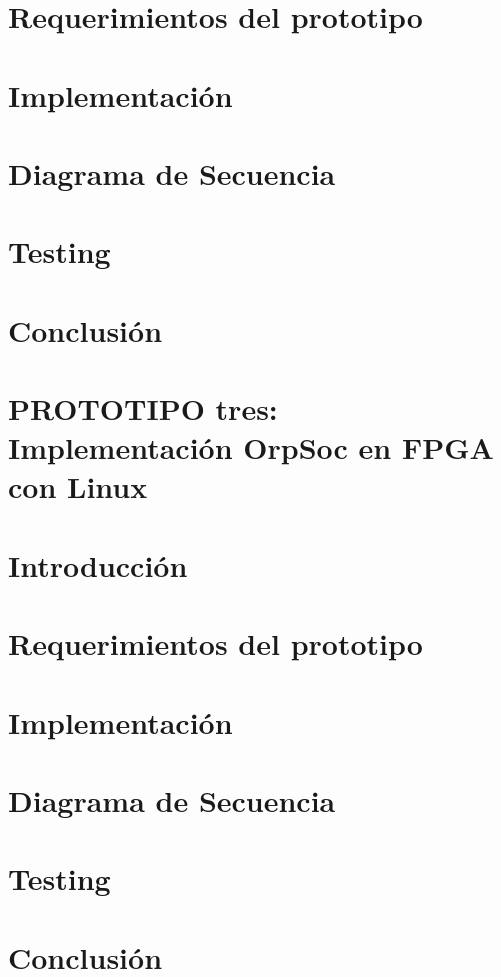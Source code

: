 		\section{Requerimientos del prototipo}
		\section{Implementación}
		\section{Diagrama de Secuencia}
		\section{Testing}
		\section{Conclusión}
	\section{PROTOTIPO tres: Implementación OrpSoc en FPGA con Linux}
		\section{Introducción}
		\section{Requerimientos del prototipo}
		\section{Implementación}
		\section{Diagrama de Secuencia}
		\section{Testing}
		\section{Conclusión}
